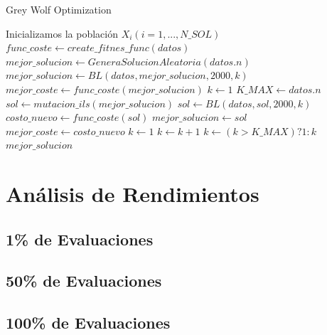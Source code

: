 \documentclass[a4paper, 12.5pt]{report}
\begin{document}
    \begin{algorithm}[H]
        \caption{Grey Wolf Optimization}\label{alg:GWO}
        \begin{algorithmic}[1]
                \State Inicializamos la población $X_i (i=1,...,N\_SOL)$
                \State $func\_coste \gets create\_fitnes\_func(datos)$
                \State $mejor\_solucion \gets GeneraSolucionAleatoria(datos.n)$
                \State $mejor\_solucion \gets BL(datos, mejor\_solucion, 2000, k)$ 
                \State $mejor\_coste \gets func\_coste(mejor\_solucion)$
                \State $k \gets 1$
                \State $K\_MAX \gets datos.n$
                    \State $sol \gets mutacion\_ils(mejor\_solucion)$
                    \State $sol \gets BL(datos, sol, 2000, k)$
                    \State $costo\_nuevo \gets func\_coste(sol)$
                        \State $mejor\_solucion \gets sol$
                        \State $mejor\_coste \gets costo\_nuevo$
                        \State $k \gets 1$
                    \Else
                        \State $k \gets k + 1$
                    \EndIf
                    \State $k \gets (k > K\_MAX) ? 1 : k$
                \EndFor
                \Return $mejor\_solucion$
            \EndFunction


        \end{algorithmic}
    \end{algorithm}


    \section{Análisis de Rendimientos}

    \subsection{1\% de Evaluaciones}

    \subsection{50\% de Evaluaciones}

    \subsection{100\% de Evaluaciones}
\end{document}
